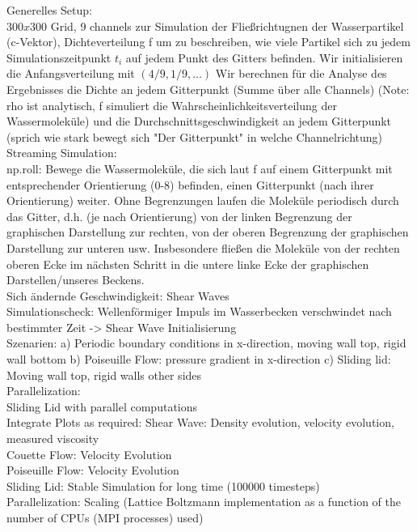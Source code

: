 \documentclass[a4paper,11pt]{report}
\begin{document}
Generelles Setup:\\
$300x300$ Grid, 9 channels zur Simulation der Fließrichtugnen der Wasserpartikel (c-Vektor), Dichteverteilung f um zu beschreiben, wie viele Partikel sich zu jedem Simulationszeitpunkt $t_i$ auf jedem Punkt des Gitters befinden. Wir initialisieren die Anfangsverteilung mit $(4/9, 1/9, ...)$
Wir berechnen für die Analyse des Ergebnisses die Dichte an jedem Gitterpunkt (Summe über alle Channels) (Note: rho ist analytisch, f simuliert die Wahrscheinlichkeitsverteilung der Wassermoleküle) und die Durchschnittsgeschwindigkeit an jedem Gitterpunkt (sprich wie stark bewegt sich "Der Gitterpunkt" in welche Channelrichtung)\\

Streaming Simulation:\\ np.roll: Bewege die Wassermoleküle, die sich laut f auf einem Gitterpunkt mit entsprechender Orientierung (0-8) befinden, einen Gitterpunkt (nach ihrer Orientierung) weiter. Ohne Begrenzungen laufen die Moleküle periodisch durch das Gitter, d.h. (je nach Orientierung) von der linken Begrenzung der graphischen Darstellung zur rechten, von der oberen Begrenzung der graphischen Darstellung zur unteren usw. Insbesondere fließen die Moleküle von der rechten oberen Ecke im nächsten Schritt in die untere linke Ecke der graphischen Darstellen/unseres Beckens.\\

Sich ändernde Geschwindigkeit: Shear Waves\\
Simulationscheck: Wellenförmiger Impuls im Wasserbecken verschwindet nach bestimmter Zeit -> Shear Wave Initialisierung\\

Szenarien: a) Periodic boundary conditions in x-direction, moving wall top, rigid wall bottom
b) Poiseuille Flow: pressure gradient in x-direction
c) Sliding lid: Moving wall top, rigid walls other sides	\\

Parallelization:\\
Sliding Lid with parallel computations\\

Integrate Plots as required:
Shear Wave: Density evolution, velocity evolution, measured viscosity\\
Couette Flow: Velocity Evolution\\
Poiseuille Flow: Velocity Evolution\\
Sliding Lid: Stable Simulation for long time (100000 timesteps)\\
Parallelization: Scaling (Lattice Boltzmann implementation as a function of the number of CPUs (MPI processes) used)\\
\end{document}
